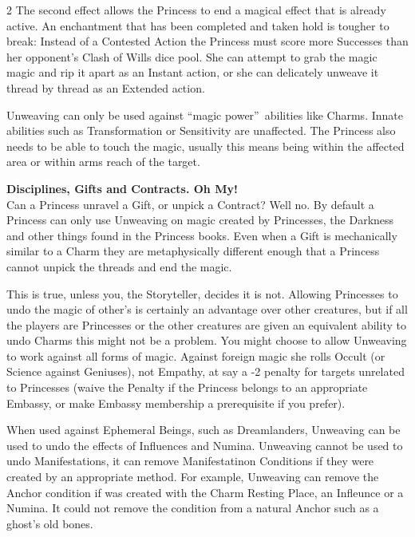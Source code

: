 \begin{multicols}{2}
The second effect allows the Princess to end a magical effect that is already active. An enchantment that has been completed and taken hold is tougher to break: Instead of a Contested Action the Princess must score more Successes than her opponent's Clash of Wills dice pool. She can attempt to grab the magic magic and rip it apart as an Instant action, or she can delicately unweave it thread by thread as an Extended action. 

Unweaving can only be used against \textquotedblleft magic power\textquotedblright\, abilities like Charms. Innate abilities such as Transformation or Sensitivity are unaffected. The Princess also needs to be able to touch the magic, usually this means being within the affected area or within arms reach of the target. 

\begin{mybox}

\noindent \textbf{Disciplines, Gifts and Contracts. Oh My!}\\

\noindent Can a Princess unravel a Gift, or unpick a Contract? Well no. By default a Princess can only use Unweaving on magic created by Princesses, the Darkness and other things found in the Princess books. Even when a Gift is mechanically similar to a Charm they are metaphysically different enough that a Princess cannot unpick the threads and end the magic.

This is true, unless you, the Storyteller, decides it is not. Allowing Princesses to undo the magic of other's is certainly an advantage over other creatures, but if all the players are Princesses or the other creatures are given an equivalent ability to undo Charms this might not be a problem. You might choose to allow Unweaving to work against all forms of magic. Against foreign magic she rolls Occult (or Science against Geniuses), not Empathy, at say a -2 penalty for targets unrelated to Princesses (waive the Penalty if the Princess belongs to an appropriate Embassy, or make Embassy membership a prerequisite if you prefer).\end{mybox}

When used against Ephemeral Beings, such as Dreamlanders, Unweaving can be used to undo the effects of Influences and Numina. Unweaving cannot be used to undo Manifestations, it can remove Manifestatinon Conditions if they were created by an appropriate method. For example, Unweaving can remove the Anchor condition if was created with the Charm Resting Place, an Infleunce or a Numina. It could not remove the condition from a natural Anchor such as a ghost's old bones. 


\end{multicols}
